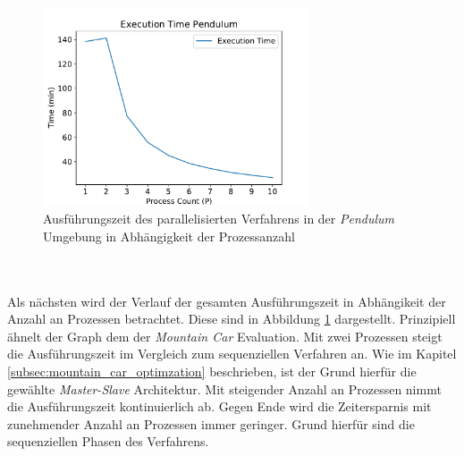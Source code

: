 \begin{figure}[!htb]
	\centering
	\includegraphics[width=0.7\textwidth]{./img/pendulum_analysis/pendulum_execution_1_1_10.pdf} 
	\caption{Ausführungszeit des parallelisierten Verfahrens in der \emph{Pendulum} Umgebung in Abhängigkeit der Prozessanzahl}
	\label{fig:pendulum_execution_time_1_10}
\end{figure}
\\\\
Als nächsten wird der Verlauf der gesamten Ausführungszeit in Abhängikeit der Anzahl an Prozessen betrachtet. Diese sind in Abbildung \ref{fig:pendulum_execution_time_1_10} dargestellt. Prinzipiell ähnelt der Graph dem der \emph{Mountain Car} Evaluation. Mit zwei Prozessen steigt die Ausführungszeit im Vergleich zum sequenziellen Verfahren an. Wie im Kapitel \ref{subsec:mountain_car_optimzation} beschrieben, ist der Grund hierfür die gewählte \emph{Master-Slave} Architektur. Mit steigender Anzahl an Prozessen nimmt die Ausführungszeit kontinuierlich ab. Gegen Ende wird die Zeitersparnis mit zunehmender Anzahl an Prozessen immer geringer. Grund hierfür sind die sequenziellen Phasen des Verfahrens. 
